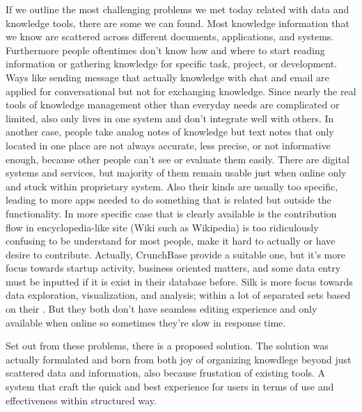If we outline the most challenging problems we met today related with data and knowledge tools, there are some we can found.
Most knowledge information that we know are scattered across different documents, applications, and systems.
Furthermore people oftentimes don't know how and where to start reading information or gathering knowledge for specific task, project, or development.
Ways like sending message that actually knowledge with chat and email are applied for conversational but not for exchanging knowledge.
Since nearly the real tools of knowledge management other than everyday needs are complicated or limited, also only lives in one system and don't integrate well with others.
In another case, people take analog notes of knowledge but text notes that only located in one place are not always accurate, less precise, or not informative enough, because other people can't see or evaluate them easily.
There are digital systems and services, but majority of them remain usable just when online only and stuck within proprietary system.
Also their kinds are usually too specific, leading to more apps needed to do something that is related but outside the functionality.
In more specific case that is clearly available is the contribution flow in encyclopedia-like site (Wiki such as Wikipedia) is too ridiculously confusing to be understand for most people, make it hard to actually or have desire to contribute.
Actually, CrunchBase provide a suitable one, but it's more focus towards startup activity, business oriented matters, and some data entry must be inputted if it is exist in their database before.
Silk is more focus towards data exploration, visualization, and analysis; within a lot of separated sets based on their .
But they both don't have seamless editing experience and only available when online so sometimes they're slow in response time.

Set out from these problems, there is a proposed solution.
The solution was actually formulated and born from both joy of organizing knowdlege beyond just scattered data and information, also because frustation of existing tools.
A system that craft the quick and best experience for users in terms of use and effectiveness within structured way.

